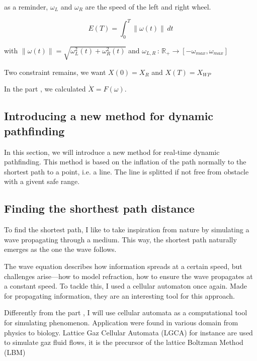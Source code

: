 \documentclass[../main.tex]{subfiles}
\begin{document}
as a reminder, $\omega_L$ and $\omega_R$ are the speed of the left and right wheel.

$$
\displaystyle E(T) = \int_{0}^{T} \| \omega(t) \| \, dt
$$

with $\displaystyle \| \omega (t) \| = \sqrt{\omega_L^{2}(t) + \omega_R^{2}(t)}$ and  $\omega_{L, R} \,:\, \mathbb{R}_+ \longrightarrow [-\omega_{max}, \omega_{max}]$ 

Two constraint remains, we want $X(0) = X_R$ and $X(T) = X_{WP}$

In the part \figtonum, we calculated $\dot{X} = F(\omega)$.


\subsection{Introducing a new method for dynamic pathfinding}

In this section, we will introduce a new method for real-time dynamic pathfinding. This method is based on the inflation of the path normally to the shortest path to a point, i.e. a line. The line is splitted if not free from obstacle with a givent safe range. 



\subsection{Finding the shorthest path distance}
To find the shortest path, I like to take inspiration from nature by simulating a wave propagating through a medium. This way, the shortest path naturally emerges as the one the wave follows.  

\vspace{1em}

The wave equation describes how information spreads at a certain speed, but challenges arise—how to model refraction, how to ensure the wave propagates at a constant speed. To tackle this, I used a cellular automaton once again. Made for propagating information, they are an interesting tool for this approach.\cite{tapia_2016}

\vspace{1em}

Differently from the part \figtonum, I will use cellular automata as a computational tool for simulating phenomenon. Application were found in various domain from physics to biology. Lattice Gaz Cellular Automata (LGCA) for instance are used to simulate gaz fluid flows, it is the precursor of the lattice Boltzman Method (LBM)\cite{chen_1998}
\end{document}
